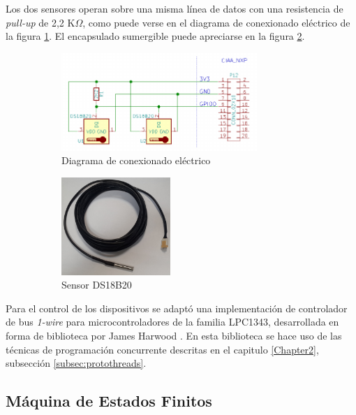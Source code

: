 Los dos sensores operan sobre una misma línea de datos con una resistencia de \textit{pull-up} de 2,2 K$\Omega$, como puede verse en el diagrama de conexionado eléctrico de la figura \ref{fig:ds18b20_conexionado}.  El encapsulado sumergible puede apreciarse en la figura \ref{fig:termometro}.


\begin{figure}[htpb]
	\centering
	\begin{subfigure}{.6\textwidth}
		\centering
		\includegraphics[height=3.7cm]{./Figures/ds18b20_conexionado.pdf}
		\caption{ Diagrama de conexionado eléctrico}
  		\label{fig:ds18b20_conexionado}
	\end{subfigure}%
	\begin{subfigure}{.4\textwidth}
		\centering
		\includegraphics[height=3.7cm]{./Figures/ds18b20.jpg}
		\caption{ Sensor DS18B20}
		\label{fig:termometro}
	\end{subfigure}
	\caption{}
	\label{fig:ds18b20}
\end{figure}


Para el control de los dispositivos se adaptó una implementación de controlador de bus \textit{1-wire} para microcontroladores de la familia LPC1343, desarrollada en forma de biblioteca por James Harwood \citep{harwood}.  En esta biblioteca se hace uso de las técnicas de programación concurrente descritas en el capitulo \ref{Chapter2}, subsección \ref{subsec:protothreads}.

\subsection{Máquina de Estados Finitos}

